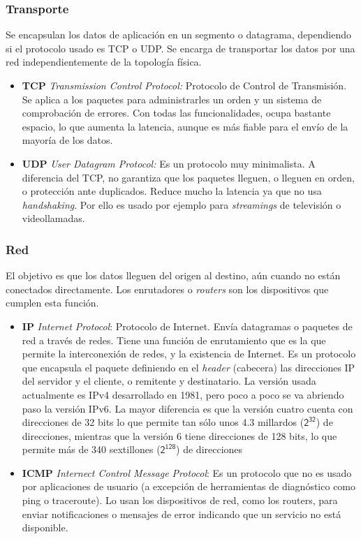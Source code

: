 \documentclass[a4paper, 11pt]{report} %
\begin{document}
\subsubsection{Transporte}
Se encapsulan los datos de aplicación en un segmento o datagrama, dependiendo si el protocolo usado es TCP o UDP. Se encarga de transportar los datos por una red independientemente de la topología física.
\begin{itemize}
\item \textbf{TCP} \textit{Transmission Control Protocol:} Protocolo de Control de Transmisión. Se aplica a los paquetes para administrarles un orden y un sistema de comprobación de errores. Con todas las funcionalidades, ocupa bastante espacio, lo que aumenta la latencia, aunque es más fiable para el envío de la mayoría de los datos.
\item \textbf{UDP} \textit{User Datagram Protocol:} Es un protocolo muy minimalista. A diferencia del TCP, no garantiza que los paquetes lleguen, o lleguen en orden, o protección ante duplicados. Reduce mucho la latencia ya que no usa \textit{handshaking}. Por ello es usado por ejemplo para \textit{streamings} de televisión o videollamadas.
\end{itemize}
\subsubsection{Red}
El objetivo es que los datos lleguen del origen al destino, aún cuando no están conectados directamente. Los enrutadores o \textit{routers} son los dispositivos que cumplen esta función.
\begin{itemize}
\item \textbf{IP} \textit{Internet Protocol}: Protocolo de Internet. Envía datagramas o paquetes de red a través de redes. Tiene una función de enrutamiento que es la que permite la interconexión de redes, y la existencia de Internet. Es un protocolo que encapsula el paquete definiendo en el \textit{header} (cabecera) las direcciones IP del servidor y el cliente, o remitente y destinatario. La versión usada actualmente es IPv4 desarrollado en 1981, pero poco a poco se va abriendo paso la versión IPv6. La mayor diferencia es que la versión cuatro cuenta con direcciones de 32 bits lo que permite tan sólo unos 4.3 millardos ($\mathsf{2^{32}}$) de direcciones, mientras que la versión 6 tiene direcciones de 128 bits, lo que permite más de 340 sextillones ($\mathsf{2^{128}}$) de direcciones
\item \textbf{ICMP} \textit{Internect Control Message Protocol}: Es un protocolo que no es usado por aplicaciones de usuario (a excepción de herramientas de diagnóstico como ping o traceroute). Lo usan los dispositivos de red, como los routers, para enviar notificaciones o mensajes de error indicando que un servicio no está disponible.
\end{itemize}
\end{document}
